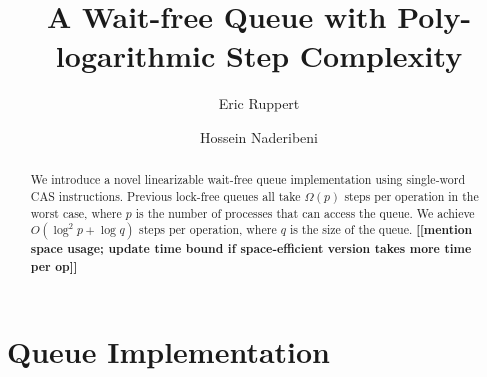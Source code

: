 \documentclass[acmsmall,nonacm,anonymous]{acmart}
\renewcommand{\bf}[1]{\textbf{#1}}
\newcommand{\here}[1]{\bf{[[#1]]}}
\begin{document}
\title{A Wait-free Queue with Poly-logarithmic Step Complexity}


\author{Eric Ruppert}

\author{Hossein Naderibeni}


\begin{abstract}
We introduce a novel linearizable wait-free queue implementation using single-word 
CAS instructions.
Previous lock-free queues all take $\Omega(p)$ steps per operation in the worst case, 
where $p$ is the number of processes that can access the queue.
We achieve $O(\log^2 p +\log q)$ steps per operation, where $q$ is the size of the queue.
\here{mention space usage; update time bound if space-efficient version takes more time per op}
\end{abstract}



\maketitle





\section{Queue Implementation} \label{DescriptQ}
\end{document}
